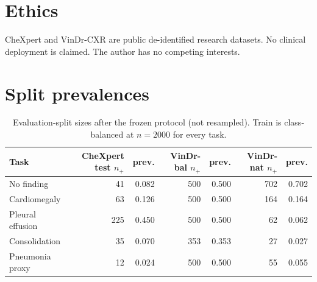 \documentclass[11pt,a4paper]{article}
\begin{document}
\section*{Ethics}

CheXpert and VinDr-CXR are public de-identified research datasets. No clinical deployment is claimed. The author has no competing interests.




\appendix
\section{Split prevalences}
\label{tab:splits}
\begin{table}[h]
\centering
\small
\caption{Evaluation-split sizes after the frozen protocol (not resampled). Train is class-balanced at $n=2000$ for every task.}
\begin{tabular}{lrrrrrr}
\toprule
Task & CheXpert test $n_+$ & prev. & VinDr-bal $n_+$ & prev. & VinDr-nat $n_+$ & prev. \\
\midrule
No finding & 41 & 0.082 & 500 & 0.500 & 702 & 0.702 \\
Cardiomegaly & 63 & 0.126 & 500 & 0.500 & 164 & 0.164 \\
Pleural effusion & 225 & 0.450 & 500 & 0.500 & 62 & 0.062 \\
Consolidation & 35 & 0.070 & 353 & 0.353 & 27 & 0.027 \\
Pneumonia proxy & 12 & 0.024 & 500 & 0.500 & 55 & 0.055 \\
\bottomrule
\end{tabular}
\end{table}
\end{document}
